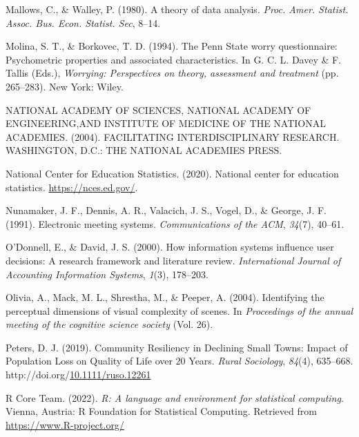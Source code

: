 \documentclass[print]{nuthesis}
\newlength{\cslhangindent}
\newenvironment{CSLReferences}[2]%
{\setlength{\parindent}{0pt}%
\everypar{\setlength{\hangindent}{\cslhangindent}}\ignorespaces}%
{\par}
\begin{document}
\begin{CSLReferences}{1}{0}
\leavevmode\hypertarget{ref-mallows1980}{}%
Mallows, C., \& Walley, P. (1980). A theory of data analysis. \emph{Proc. Amer. Statist. Assoc. Bus. Econ. Statist. Sec}, 8--14.

\leavevmode\hypertarget{ref-Molina1994}{}%
Molina, S. T., \& Borkovec, T. D. (1994). The {P}enn {S}tate worry questionnaire: Psychometric properties and associated characteristics. In G. C. L. Davey \& F. Tallis (Eds.), \emph{Worrying: Perspectives on theory, assessment and treatment} (pp. 265--283). New York: Wiley.

\leavevmode\hypertarget{ref-NATIONALACADEMYOFSCIENCES}{}%
NATIONAL ACADEMY OF SCIENCES, NATIONAL ACADEMY OF ENGINEERING,AND INSTITUTE OF MEDICINE OF THE NATIONAL ACADEMIES. (2004). FACILITATING INTERDISCIPLINARY RESEARCH. WASHINGTON, D.C.: THE NATIONAL ACADEMIES PRESS.

\leavevmode\hypertarget{ref-elsi}{}%
National Center for Education Statistics. (2020). National center for education statistics. \url{https://nces.ed.gov/}.

\leavevmode\hypertarget{ref-nunamaker1991}{}%
Nunamaker, J. F., Dennis, A. R., Valacich, J. S., Vogel, D., \& George, J. F. (1991). Electronic meeting systems. \emph{Communications of the ACM}, \emph{34}(7), 40--61.

\leavevmode\hypertarget{ref-odonnell2000}{}%
O'Donnell, E., \& David, J. S. (2000). How information systems influence user decisions: A research framework and literature review. \emph{International Journal of Accounting Information Systems}, \emph{1}(3), 178--203.

\leavevmode\hypertarget{ref-olivia2004}{}%
Olivia, A., Mack, M. L., Shrestha, M., \& Peeper, A. (2004). Identifying the perceptual dimensions of visual complexity of scenes. In \emph{Proceedings of the annual meeting of the cognitive science society} (Vol. 26).

\leavevmode\hypertarget{ref-petersCommunityResiliencyDeclining2019}{}%
Peters, D. J. (2019). Community {Resiliency} in {Declining} {Small} {Towns}: {Impact} of {Population} {Loss} on {Quality} of {Life} over 20 {Years}. \emph{Rural Sociology}, \emph{84}(4), 635--668. http://doi.org/\href{https://doi.org/10.1111/ruso.12261}{10.1111/ruso.12261}

\leavevmode\hypertarget{ref-r}{}%
R Core Team. (2022). \emph{R: A language and environment for statistical computing}. Vienna, Austria: R Foundation for Statistical Computing. Retrieved from \url{https://www.R-project.org/}


\end{CSLReferences}
\end{document}
